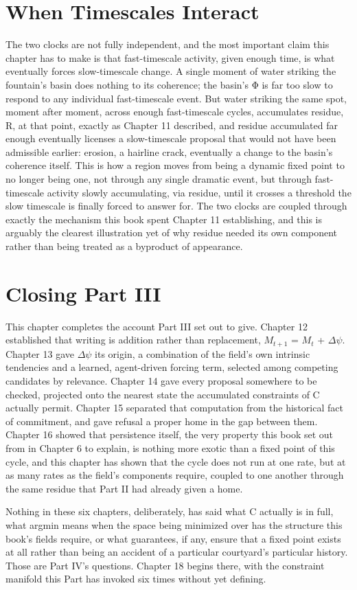 \section{When Timescales Interact}

The two clocks are not fully independent, and the most important claim this chapter has to make is that fast-timescale activity, given enough time, is what eventually forces slow-timescale change. A single moment of water striking the fountain's basin does nothing to its coherence; the basin's Φ is far too slow to respond to any individual fast-timescale event. But water striking the same spot, moment after moment, across enough fast-timescale cycles, accumulates residue, R, at that point, exactly as Chapter 11 described, and residue accumulated far enough eventually licenses a slow-timescale proposal that would not have been admissible earlier: erosion, a hairline crack, eventually a change to the basin's coherence itself. This is how a region moves from being a dynamic fixed point to no longer being one, not through any single dramatic event, but through fast-timescale activity slowly accumulating, via residue, until it crosses a threshold the slow timescale is finally forced to answer for. The two clocks are coupled through exactly the mechanism this book spent Chapter 11 establishing, and this is arguably the clearest illustration yet of why residue needed its own component rather than being treated as a byproduct of appearance.

\section{Closing Part III}

This chapter completes the account Part III set out to give. Chapter 12 established that writing is addition rather than replacement, \(M_{t+1}\) = \(M_t\) + \(\Delta\psi\). Chapter 13 gave \(\Delta\psi\) its origin, a combination of the field's own intrinsic tendencies and a learned, agent-driven forcing term, selected among competing candidates by relevance. Chapter 14 gave every proposal somewhere to be checked, projected onto the nearest state the accumulated constraints of C actually permit. Chapter 15 separated that computation from the historical fact of commitment, and gave refusal a proper home in the gap between them. Chapter 16 showed that persistence itself, the very property this book set out from in Chapter 6 to explain, is nothing more exotic than a fixed point of this cycle, and this chapter has shown that the cycle does not run at one rate, but at as many rates as the field's components require, coupled to one another through the same residue that Part II had already given a home.

Nothing in these six chapters, deliberately, has said what C actually is in full, what argmin means when the space being minimized over has the structure this book's fields require, or what guarantees, if any, ensure that a fixed point exists at all rather than being an accident of a particular courtyard's particular history. Those are Part IV's questions. Chapter 18 begins there, with the constraint manifold this Part has invoked six times without yet defining.

